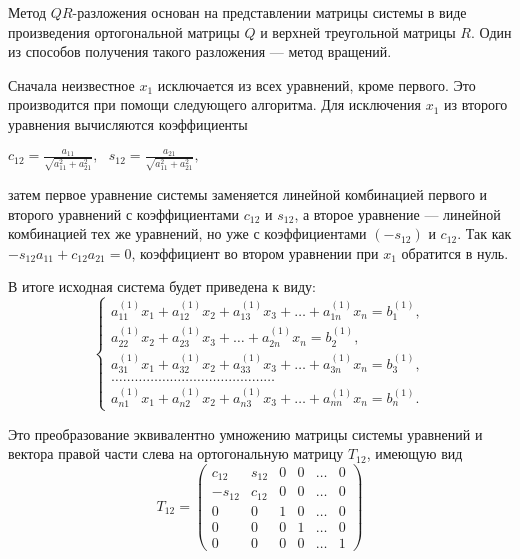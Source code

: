 \documentclass[12pt, a4paper]{article}
\begin{document}
    
    Метод $QR$-разложения основан на представлении матрицы системы в виде произведения ортогональной матрицы $Q$ и верхней треугольной матрицы $R$. Один из способов получения такого разложения --- метод вращений. 
    
    Сначала неизвестное $x_1$ исключается из всех уравнений, кроме первого. Это производится при помощи следующего алгоритма. Для исключения $x_1$ из второго уравнения вычисляются коэффициенты
    
    \begin{center}
    $c_{12}=\frac{a_{11}}{\sqrt{a_{11}^{2}+a_{21}^{2}}}, ~ ~ ~
    s_{12}=\frac{a_{21}}{\sqrt{a_{11}^{2}+a_{21}^{2}}},$
    \end{center}
    затем первое уравнение системы заменяется линейной комбинацией первого и второго уравнений с коэффициентами $c_{12}$ и $s_{12}$, а второе уравнение --- линейной комбинацией тех же уравнений, но уже с коэффициентами $(-s_{12})$ и $c_{12}$. Так как $-s_{12}a_{11} + c_{12}a_{21}=0$, коэффициент во втором уравнении при $x_1$ обратится в нуль. 
     
    В итоге исходная система будет приведена к виду: 
    \begin{equation*}
        \begin{cases}
        a_{11}^{(1)}x_{1} + a_{12}^{(1)}x_{2}+ a_{13}^{(1)}x_{3}+ \ldots + a_{1n}^{(1)}x_{n} = b_{1}^{(1)},\\
            a_{22}^{(1)}x_{2}+ a_{23}^{(1)}x_{3}+ \ldots + a_{2n}^{(1)}x_{n} = b_{2}^{(1)},\\
            a_{31}^{(1)}x_{1} + a_{32}^{(1)}x_{2}+ a_{33}^{(1)}x_{3}+ \ldots + a_{3n}^{(1)}x_{n} = b_{3}^{(1)},\\
            \ldots\ldots\ldots\ldots\ldots\ldots\ldots\ldots\ldots\ldots\ldots\ldots\ldots\ldots \\
                a_{n1}^{(1)}x_{1} + a_{n2}^{(1)}x_{2}+ a_{n3}^{(1)}x_{3}+ \ldots + a_{nn}^{(1)}x_{n} = b_{n}^{(1)}.
        \end{cases}
    \end{equation*}

Это преобразование эквивалентно умножению матрицы системы уравнений и вектора правой части слева на ортогональную матрицу $T_{12}$, имеющую вид \\ 
\[
T_{12}=
\begin{pmatrix}
c_{12} & s_{12} & 0 & 0 & \ldots & 0 \\
-s_{12} & c_{12} & 0 & 0 & \ldots & 0 \\
0 & 0 & 1 & 0 & \ldots & 0 \\
0 & 0 & 0 & 1 & \ldots & 0 \\
0 & 0 & 0 & 0 & \ldots & 1
\end{pmatrix}
\]
\end{document}
